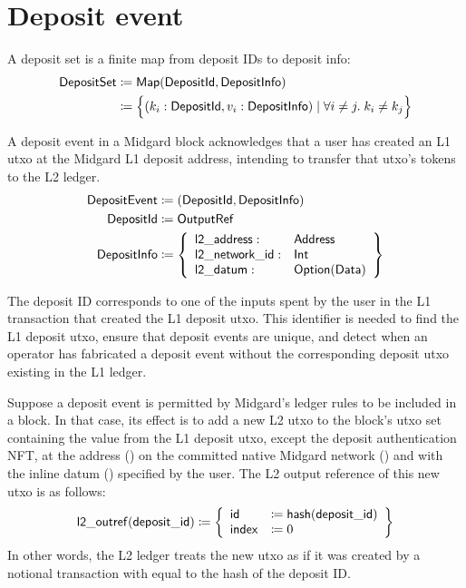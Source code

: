 \documentclass[../midgard.tex]{subfiles}
\begin{document}
\section{Deposit event}
\label{h:deposit-event}

A deposit set is a finite map from deposit IDs to deposit info:
\begin{align*}
    \mathsf{DepositSet} &\coloneq \mathsf{Map(DepositId, DepositInfo)} \\
      &\coloneq \Bigl\{
        (k_i: \mathsf{DepositId}, v_i: \mathsf{DepositInfo}) \mid \forall i \neq j.\; k_i \neq k_j
    \Bigr\}
\end{align*}

A deposit event in a Midgard block acknowledges that a user has created an L1 utxo at the Midgard L1 deposit address, intending to transfer that utxo's tokens to the L2 ledger.
\begin{align*}
    \mathsf{DepositEvent} &\coloneq (\mathsf{DepositId}, \mathsf{DepositInfo}) \\
    \mathsf{DepositId} &\coloneq \mathsf{OutputRef} \\
    \mathsf{DepositInfo} &\coloneq \left\{
        \begin{array}{ll}
            \mathsf{l2\_address} : & \mathsf{Address} \\
            \mathsf{l2\_network\_id} : & \mathsf{Int} \\
            \mathsf{l2\_datum} : & \mathsf{Option(Data)} \\
        \end{array} \right\}
\end{align*}

The deposit ID corresponds to one of the inputs spent by the user in the L1 transaction that created the L1 deposit utxo.
This identifier is needed to find the L1 deposit utxo, ensure that deposit events are unique, and detect when an operator has fabricated a deposit event without the corresponding deposit utxo existing in the L1 ledger.

Suppose a deposit event is permitted by Midgard's ledger rules to be included in a block.
In that case, its effect is to add a new L2 utxo to the block's utxo set containing the value from the L1 deposit utxo, except the deposit authentication NFT, at the address () on the committed native Midgard network () and with the inline datum () specified by the user.
The L2 output reference of this new utxo is as follows: 
\begin{equation*}
    \mathsf{l2\_outref(deposit\_id)} \coloneq \left\{
    \begin{array}{ll}
        \mathsf{id} &\coloneq \mathsf{hash(deposit\_id)} \\
        \mathsf{index} &\coloneq 0
    \end{array} \right\}
\end{equation*}
In other words, the L2 ledger treats the new utxo as if it was created by a notional transaction with  equal to the hash of the deposit ID.
\end{document}
